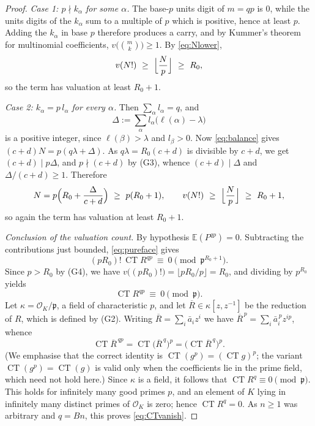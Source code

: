 \documentclass[10pt,a4paper]{amsart}
\numberwithin{equation}{section}
\DeclareMathOperator{\CT}{CT}
\newcommand{\E}{\mathbb{E}}
\begin{document}
\begin{proof}
\emph{Case 1: $p\nmid k_\alpha$ for some $\alpha$.} The base-$p$ units digit of
$m=qp$ is $0$, while the units digits of the $k_\alpha$ sum to a multiple of
$p$ which is positive, hence at least $p$. Adding the $k_\alpha$ in base $p$
therefore produces a carry, and by Kummer's theorem for multinomial
coefficients, $v\bigl(\binom{m}{k}\bigr)\ge1$. By \eqref{eq:Nlower},
\[
  v(N!)\ \ge\ \Bigl\lfloor\frac{N}{p}\Bigr\rfloor\ \ge\ R_0 ,
\]
so the term has valuation at least $R_0+1$.

\emph{Case 2: $k_\alpha=p\,l_\alpha$ for every $\alpha$.} Then
$\sum_\alpha l_\alpha=q$, and
\[
  \Delta:=\sum_\alpha l_\alpha\bigl(\ell(\alpha)-\lambda\bigr)
\]
is a positive integer, since $\ell(\beta)>\lambda$ and $l_\beta>0$. Now
\eqref{eq:balance} gives $(c+d)N=p(q\lambda+\Delta)$. As $q\lambda=R_0(c+d)$ is
divisible by $c+d$, we get $(c+d)\mid p\Delta$, and $p\nmid(c+d)$ by (G3),
whence $(c+d)\mid\Delta$ and $\Delta/(c+d)\ge1$. Therefore
\[
  N=p\Bigl(R_0+\frac{\Delta}{c+d}\Bigr)\ \ge\ p(R_0+1),
  \qquad
  v(N!)\ \ge\ \Bigl\lfloor\frac{N}{p}\Bigr\rfloor\ \ge\ R_0+1 ,
\]
so again the term has valuation at least $R_0+1$.

\smallskip
\noindent\emph{Conclusion of the valuation count.} By hypothesis
$\E(P^{qp})=0$. Subtracting the contributions just bounded, \eqref{eq:pureface}
gives
\[
  (pR_0)!\,\CT R^{qp}\ \equiv\ 0 \pmod{\mathfrak p^{R_0+1}} .
\]
Since $p>R_0$ by (G4), we have
$v\bigl((pR_0)!\bigr)=\lfloor pR_0/p\rfloor=R_0$, and dividing by $p^{R_0}$
yields
\[
  \CT R^{qp}\ \equiv\ 0 \pmod{\mathfrak p} .
\]
Let $\kappa=\mathcal O_K/\mathfrak p$, a field of characteristic $p$, and let
$\overline R\in\kappa[z,z^{-1}]$ be the reduction of $R$, which is defined by
(G2). Writing $\overline R=\sum_i \bar a_iz^i$ we have
$\overline R^{\,p}=\sum_i\bar a_i^{\,p}z^{ip}$, whence
\[
  \CT \overline R^{\,qp}
  =\CT\bigl(\overline R^{\,q}\bigr)^{p}
  =\bigl(\CT \overline R^{\,q}\bigr)^{p} .
\]
(We emphasise that the correct identity is $\CT(g^p)=(\CT g)^p$; the variant
$\CT(g^p)=\CT(g)$ is valid only when the coefficients lie in the prime field,
which need not hold here.) Since $\kappa$ is a field, it follows that
$\CT R^{q}\equiv0\pmod{\mathfrak p}$. This holds for infinitely many good
primes $p$, and an element of $K$ lying in infinitely many distinct primes of
$\mathcal O_K$ is zero; hence $\CT R^{q}=0$. As $n\ge1$ was arbitrary and
$q=Bn$, this proves \eqref{eq:CTvanish}.


\end{proof}
\end{document}
